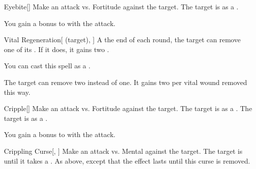 \lowercase{\hypertarget{spell:Eyebite}{}}\label{spell:Eyebite}
\begin{freeability}[Rank 5]{\hypertarget{spell:Eyebite}{Eyebite}}[]
Make an attack vs. Fortitude against the target.
\hit The target is  as a .

\rankline
{} You gain a  bonus to  with the attack.

\end{freeability}
\vspace{0.25em}



\lowercase{\hypertarget{spell:Vital Regeneration}{}}\label{spell:Vital Regeneration}
\begin{attuneability}[Rank 5]{\hypertarget{spell:Vital Regeneration}{Vital Regeneration}}[ (target), ]
A the end of each round, the target can remove one of its .
If it does, it gains two .

You can cast this spell as a .

\rankline
{} The target can remove two  instead of one.
It gains two  per vital wound removed this way.

\end{attuneability}
\vspace{0.25em}



\lowercase{\hypertarget{spell:Cripple}{}}\label{spell:Cripple}
\begin{freeability}[Rank 6]{\hypertarget{spell:Cripple}{Cripple}}[]
Make an attack vs. Fortitude against the target.
\hit The target is  as a .
\crit The target is  as a .

\rankline
{} You gain a  bonus to  with the attack.

\end{freeability}
\vspace{0.25em}



\lowercase{\hypertarget{spell:Crippling Curse}{}}\label{spell:Crippling Curse}
\begin{freeability}[Rank 8]{\hypertarget{spell:Crippling Curse}{Crippling Curse}}[, ]
Make an attack vs. Mental against the target.
\hit The target is  until it takes a .
\crit As above, except that the effect lasts until this curse is removed.

\end{freeability}
\vspace{0.25em}



